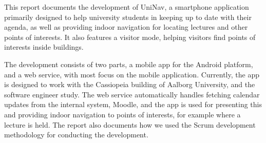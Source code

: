

This report documents the development of UniNav, a smartphone application primarily designed to help university students in keeping up to date with their agenda, as well as providing indoor navigation for locating lectures and other points of interests. It also features a visitor mode, helping visitors find points of interests inside buildings.

The development consists of two parts, a mobile app for the Android platform, and a web service, with most focus on the mobile application. Currently, the app is designed to work with the Cassiopeia building of Aalborg University, and the software engineer study. The web service automatically handles fetching calendar updates from the internal system, Moodle, and the app is used for presenting this and providing indoor navigation to points of interests, for example where a lecture is held. The report also documents how we used the Scrum development methodology for conducting the development. 